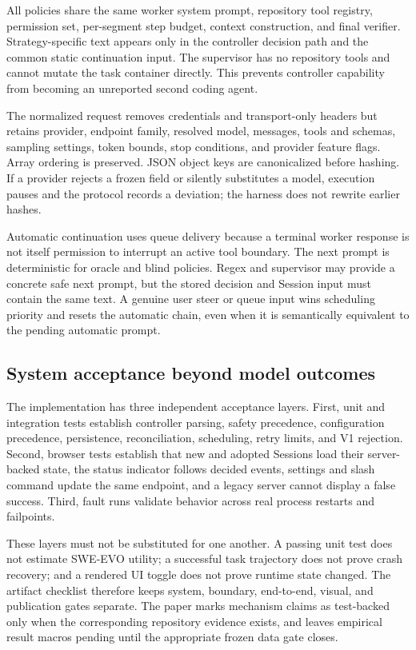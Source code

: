 All policies share the same worker system prompt, repository tool registry, permission set, per-segment step budget, context construction, and final verifier. Strategy-specific text appears only in the controller decision path and the common static continuation input. The supervisor has no repository tools and cannot mutate the task container directly. This prevents controller capability from becoming an unreported second coding agent.

The normalized request removes credentials and transport-only headers but retains provider, endpoint family, resolved model, messages, tools and schemas, sampling settings, token bounds, stop conditions, and provider feature flags. Array ordering is preserved. JSON object keys are canonicalized before hashing. If a provider rejects a frozen field or silently substitutes a model, execution pauses and the protocol records a deviation; the harness does not rewrite earlier hashes.

Automatic continuation uses queue delivery because a terminal worker response is not itself permission to interrupt an active tool boundary. The next prompt is deterministic for oracle and blind policies. Regex and supervisor may provide a concrete safe next prompt, but the stored decision and Session input must contain the same text. A genuine user steer or queue input wins scheduling priority and resets the automatic chain, even when it is semantically equivalent to the pending automatic prompt.

\subsection{System acceptance beyond model outcomes}

The implementation has three independent acceptance layers. First, unit and integration tests establish controller parsing, safety precedence, configuration precedence, persistence, reconciliation, scheduling, retry limits, and V1 rejection. Second, browser tests establish that new and adopted Sessions load their server-backed state, the status indicator follows decided events, settings and slash command update the same endpoint, and a legacy server cannot display a false success. Third, fault runs validate behavior across real process restarts and failpoints.

These layers must not be substituted for one another. A passing unit test does not estimate SWE-EVO utility; a successful task trajectory does not prove crash recovery; and a rendered UI toggle does not prove runtime state changed. The artifact checklist therefore keeps system, boundary, end-to-end, visual, and publication gates separate. The paper marks mechanism claims as test-backed only when the corresponding repository evidence exists, and leaves empirical result macros pending until the appropriate frozen data gate closes.


